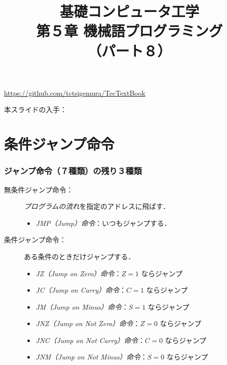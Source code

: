 \documentclass{beamer}                 %
\begin{document}
\title{基礎コンピュータ工学\\第５章 機械語プログラミング\\（パート８）}
\date{}

\begin{frame}
  \titlepage
  \centerline{\url{https://github.com/tctsigemura/TecTextBook}}
  \vfill
  \centerline{本スライドの入手：
    }
\end{frame}


\section{条件ジャンプ命令}
\begin{frame}
  \frametitle{ジャンプ命令（７種類）の残り３種類}
  \begin{description}
  \item[無条件ジャンプ命令：]\emph{プログラムの流れ}を指定のアドレスに飛ばす．
    \begin{itemize}
      \item \emph{JMP（Jump）命令}：いつもジャンプする．
    \end{itemize}
    \vfill
  \item[条件ジャンプ命令：]ある条件のときだけジャンプする．
    \begin{itemize}
      \item \emph{JZ（Jump on Zero）命令}：$Z=1$ ならジャンプ
        \vfill
      \item \emph{JC（Jump on Carry）命令}：$C=1$ ならジャンプ
        \vfill
      \item \emph{JM（Jump on Minus）命令}：$S=1$ ならジャンプ
        \vfill
      \item \emph{JNZ（Jump on Not Zero）命令}：$Z=0$ ならジャンプ
        \vfill
      \item \emph{JNC（Jump on Not Carry）命令}：$C=0$ ならジャンプ
        \vfill
      \item \emph{JNM（Jump on Not Minus）命令}：$S=0$ ならジャンプ
    \end{itemize}
  \end{description}
  \vfill
\end{frame}
\end{document}
